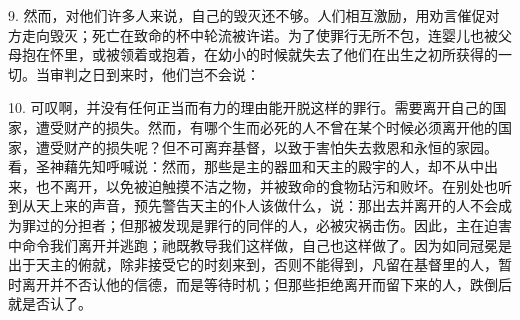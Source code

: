 9. 然而，对他们许多人来说，自己的毁灭还不够。\newline{}人们相互激励，用劝言催促对方走向毁灭；死亡在致命的杯中轮流被许诺。\newline{}为了使罪行无所不包，连婴儿也被父母抱在怀里，或被领着或抱着，在幼小的时候就失去了他们在出生之初所获得的一切。\newline{}当审判之日到来时，他们岂不会说：\par

10. 可叹啊，并没有任何正当而有力的理由能开脱这样的罪行。\newline{}需要离开自己的国家，遭受财产的损失。\newline{}然而，有哪个生而必死的人不曾在某个时候必须离开他的国家，遭受财产的损失呢？\newline{}但不可离弃基督，以致于害怕失去救恩和永恒的家园。\newline{}看，圣神藉先知呼喊说：\newline{}然而，那些是主的器皿和天主的殿宇的人，却不从中出来，也不离开，以免被迫触摸不洁之物，并被致命的食物玷污和败坏。\newline{}在别处也听到从天上来的声音，预先警告天主的仆人该做什么，说：\newline{}那出去并离开的人不会成为罪过的分担者；但那被发现是罪行的同伴的人，必被灾祸击伤。\newline{}因此，主在迫害中命令我们离开并逃跑；祂既教导我们这样做，自己也这样做了。\newline{}因为如同冠冕是出于天主的俯就，除非接受它的时刻来到，否则不能得到，凡留在基督里的人，暂时离开并不否认他的信德，而是等待时机；但那些拒绝离开而留下来的人，跌倒后就是否认了。\par

